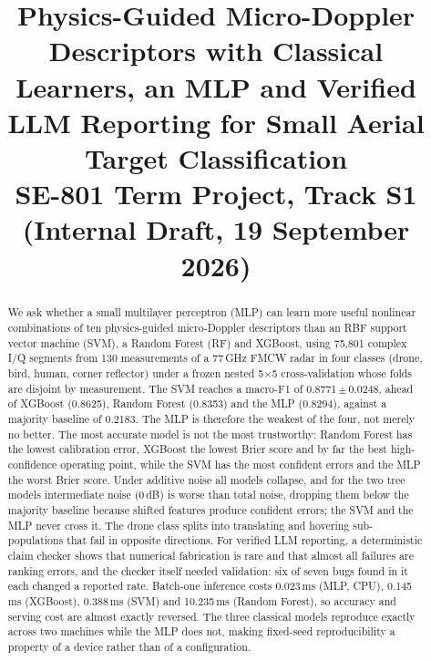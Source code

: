 \documentclass[conference]{IEEEtran}
\newcommand{\pending}[1]{\textcolor{red}{[#1]}}
\newcommand{\pmv}[2]{#1\,$\pm$\,#2}
\begin{document}
\title{Physics-Guided Micro-Doppler Descriptors with Classical Learners, an MLP and Verified LLM Reporting for Small Aerial Target Classification\\
\large SE-801 Term Project, Track S1 (Internal Draft, 19 September 2026)}

\author{\IEEEauthorblockN{\pending{Student name}, Track S1}
}

\maketitle

\begin{abstract}
We ask whether a small multilayer perceptron (MLP) can learn more useful nonlinear combinations of ten physics-guided micro-Doppler descriptors than an RBF support vector machine (SVM), a Random Forest (RF) and XGBoost, using 75,801 complex I/Q segments from 130 measurements of a 77\,GHz FMCW radar in four classes (drone, bird, human, corner reflector) under a frozen nested 5$\times$5 cross-validation whose folds are disjoint by measurement. The SVM reaches a macro-F1 of \pmv{0.8771}{0.0248}, ahead of XGBoost (0.8625), Random Forest (0.8353) and the MLP (0.8294), against a majority baseline of 0.2183. The MLP is therefore the weakest of the four, not merely no better. The most accurate model is not the most trustworthy: Random Forest has the lowest calibration error, XGBoost the lowest Brier score and by far the best high-confidence operating point, while the SVM has the most confident errors and the MLP the worst Brier score. Under additive noise all models collapse, and for the two tree models intermediate noise (0\,dB) is worse than total noise, dropping them below the majority baseline because shifted features produce confident errors; the SVM and the MLP never cross it. The drone class splits into translating and hovering sub-populations that fail in opposite directions. For verified LLM reporting, a deterministic claim checker shows that numerical fabrication is rare and that almost all failures are ranking errors, and the checker itself needed validation: six of seven bugs found in it each changed a reported rate. Batch-one inference costs 0.023\,ms (MLP, CPU), 0.145\,ms (XGBoost), 0.388\,ms (SVM) and 10.235\,ms (Random Forest), so accuracy and serving cost are almost exactly reversed. The three classical models reproduce exactly across two machines while the MLP does not, making fixed-seed reproducibility a property of a device rather than of a configuration.
\end{abstract}
\end{document}
